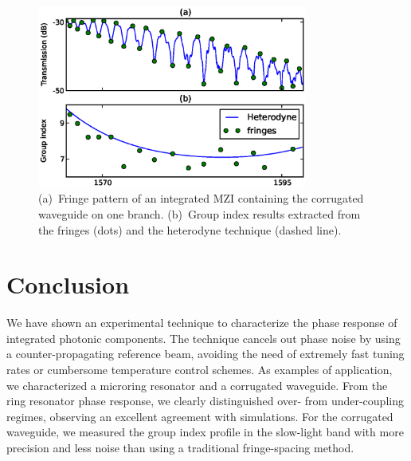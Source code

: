 \documentclass[journal]{IEEEtran}
\newcommand{\fwidthBig}{3.5in}
\begin{document}

\begin{figure}[htb]
  \centering
  \includegraphics[width=\fwidthBig]{gropIndexComparison_2}
  \caption{(a)~Fringe pattern of an integrated MZI containing the corrugated waveguide on one branch. (b)~Group index results extracted from the fringes (dots) and the heterodyne technique (dashed line).}
  \label{fig:groupIndex}
\end{figure}



\section{Conclusion}
We have shown an experimental technique to characterize the phase response of integrated photonic components.
The technique cancels out phase noise by using a counter-propagating reference beam, avoiding the need of extremely fast tuning rates or cumbersome temperature control schemes.
As examples of application, we characterized a microring resonator and a corrugated waveguide.
From the ring resonator phase response, we clearly distinguished over- from under-coupling regimes, observing an excellent agreement with simulations.
For the corrugated waveguide, we measured the group index profile in the slow-light band with more precision and less noise than using a traditional fringe-spacing method.
\end{document}
